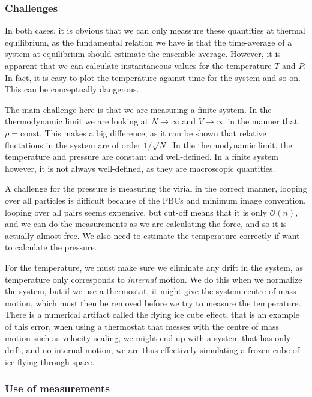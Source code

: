 \documentclass[a4paper, 11pt, notitlepage, english]{article}
\begin{document}
\subsubsection*{Challenges}

In both cases, it is obvious that we can only meassure these quantities at thermal equilibrium, as the fundamental relation we have is that the time-average of a system at equilibrium should estimate the ensemble average. However, it is apparent that we can calculate instantaneous values for the temperature $T$ and $P$. In fact, it is easy to plot the temperature against time for the system and so on. This can be conceptually dangerous.

The main challenge here is that we are measuring a finite system. In the thermodynamic limit we are looking at $N\to \infty$ and $V\to \infty$ in the manner that $\rho = \mbox{const}$. This makes a big difference, as it can be shown that relative fluctations in the system are of order $1/\sqrt{N}$. In the thermodynamic limit, the temperature and pressure are constant and well-defined. In a finite system however, it is not always well-defined, as they are macroscopic quantities.

A challenge for the pressure is measuring the virial in the correct manner, looping over all particles is difficult because of the PBCs and minimum image convention, looping over all pairs seems expensive, but cut-off means that it is only $\mathcal{O}(n)$, and we can do the measurements as we are calculating the force, and so it is actually almost free. We also need to estimate the temperature correctly if want to calculate the pressure.

For the temperature, we must make sure we eliminate any drift in the system, as temperature only corresponds to \emph{internal} motion. We do this when we normalize the system, but if we use a thermostat, it might give the system centre of mass motion, which must then be removed before we try to measure the temperature. There is a numerical artifact called the flying ice cube effect, that is an example of this error, when using a thermostat that messes with the centre of mass motion such as velocity scaling, we might end up with a system that has only drift, and no internal motion, we are thus effectively simulating a frozen cube of ice flying through space.

\subsubsection*{Use of measurements}
\end{document}
